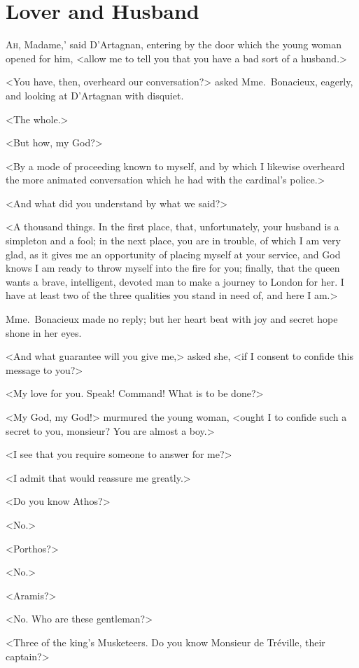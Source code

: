 
\chapter{Lover and Husband}

\lettrine[,ante=`]{A}{h,} Madame,' said D'Artagnan, entering by the door which the young woman opened for him, <allow me to tell you that you have a bad sort of a husband.> 

\zz
<You have, then, overheard our conversation?> asked Mme.~Bonacieux, eagerly, and looking at D'Artagnan with disquiet. 

<The whole.> 

<But how, my God?> 

<By a mode of proceeding known to myself, and by which I likewise overheard the more animated conversation which he had with the cardinal's police.> 

<And what did you understand by what we said?> 

<A thousand things. In the first place, that, unfortunately, your husband is a simpleton and a fool; in the next place, you are in trouble, of which I am very glad, as it gives me an opportunity of placing myself at your service, and God knows I am ready to throw myself into the fire for you; finally, that the queen wants a brave, intelligent, devoted man to make a journey to London for her. I have at least two of the three qualities you stand in need of, and here I am.> 

Mme.~Bonacieux made no reply; but her heart beat with joy and secret hope shone in her eyes. 

<And what guarantee will you give me,> asked she, <if I consent to confide this message to you?> 

<My love for you. Speak! Command! What is to be done?> 

<My God, my God!> murmured the young woman, <ought I to confide such a secret to you, monsieur? You are almost a boy.> 

<I see that you require someone to answer for me?> 

<I admit that would reassure me greatly.> 

<Do you know Athos?> 

<No.> 

<Porthos?> 

<No.> 

<Aramis?> 

<No. Who are these gentleman?> 

<Three of the king's Musketeers. Do you know Monsieur de Tréville, their captain?> 

